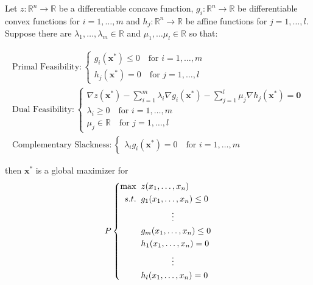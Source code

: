 \begin{theorem} Let $z : \mathbb{R}^n \rightarrow \mathbb{R}$ be a differentiable concave  function, $g_i:\mathbb{R}^n \rightarrow \mathbb{R}$ be differentiable convex functions for $i = 1,\dots,m$ and $h_j:\mathbb{R}^n \rightarrow \mathbb{R}$ be affine functions for $j=1,\dots,l$. Suppose there are $\lambda_1,\dots,\lambda_m \in \mathbb{R}$ and $\mu_1,\dots\mu_l \in \mathbb{R}$ so that:

\begin{gather*}
\text{Primal Feasibility}: \left\{
\begin{aligned}
g_i(\mathbf{x}^*) \leq 0 \quad \text{for $i = 1,\dots,m$}\\
h_j(\mathbf{x}^*) = 0 \quad \text{for $j = 1,\dots,l$}
\end{aligned}
\right.\\
\text{Dual Feasibility}:\left\{
\begin{aligned}
\nabla z(\mathbf{x}^*) - \sum_{i = 1}^m\lambda_i\nabla g_i(\mathbf{x}^*) - \sum_{j = 1}^{l}\mu_j\nabla h_j(\mathbf{x}^*) = \mathbf{0}\\
\lambda_i \geq 0 \quad \text{for $i=1,\dots,m$}\\
\mu_j \in \mathbb{R} \quad \text{for $j = 1,\dots,l$}
\end{aligned}
\right.\\
\text{Complementary Slackness}:\left\{
\begin{aligned}
\lambda_ig_i(\mathbf{x}^*) = 0 \quad \text{for $i = 1,\dots,m$}
\end{aligned}
\right.
\end{gather*}

then $\mathbf{x}^*$ is a global maximizer for 
\begin{displaymath}
P\left\{
\begin{aligned}
\max\;\;& z(x_1,\dots,x_n)\\
s.t.\;\;& g_1(x_1,\dots,x_n) \leq 0\\
& \hspace*{0.5in}\vdots\\
& g_m(x_1,\dots,x_n) \leq 0\\
& h_1(x_1,\dots,x_n) = 0\\
&\hspace*{0.5in}\vdots\\
&h_l(x_1,\dots,x_n) = 0
\end{aligned}
\right.
\end{displaymath}
\label{thm:KKT8}
\end{theorem}


